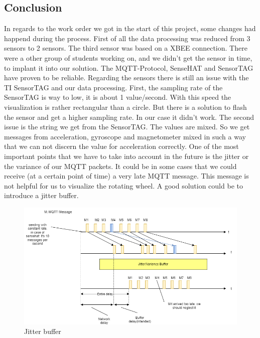 \documentclass[12pt]{article}
\begin{document}
\subsection{Conclusion}
In regards to the work order we got in the start of this project, some changes had happend during the process.
First of all the data processing was reduced from 3 sensors to 2 sensors. The third sensor was based on a XBEE connection. There were a other group of students working on, and we didn't get the sensor in time, to implant it into our solution. The MQTT-Protocol, SenseHAT and SensorTAG have proven to be reliable.\newline
Regarding the sensors there is still an issue with the TI SensorTAG and our data processing. First, the sampling rate of the SensorTAG is way to low, it is about 1 value/second. With this speed the visualization is rather rectangular than a circle. But there is a solution to flash the sensor and get a higher sampling rate. In our case it didn't work.\newline
The second issue is the string we get from the SensorTAG. The values are mixed. So we get messages from acceleration, gyroscope and magnetometer mixed in such a way that we can not discern the value for acceleration correctly.\newline
One of the most important points that we have to take into account in the future is the jitter or the variance of our MQTT packets. It could be in some cases that we could receive (at a certain point of time) a very late MQTT message. This message is not helpful for us to visualize the rotating wheel. A good solution could be to introduce a jitter buffer. 
\begin{figure}[H]
	\includegraphics[width=1\linewidth]{jitter.png}
	\centering
	\caption{Jitter buffer}
	\label{fig:jitter.jpg}
\end{figure}
\end{document}
